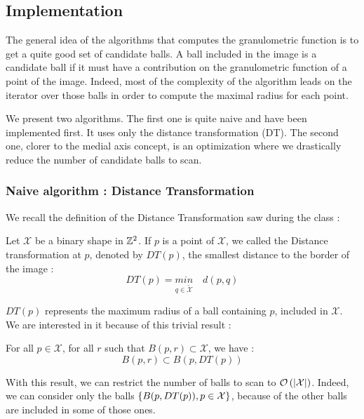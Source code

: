 

\subsection{Implementation}

The general idea of the algorithms that computes the granulometric function is to get a quite good set of candidate balls. A ball included in the image is a candidate ball if it must have a contribution on the granulometric function of a point of the image. Indeed, most of the complexity of the algorithm leads on the iterator over those balls in order to compute the maximal radius for each point. 

We present two algorithms. The first one is quite naive and have been implemented first. It uses only the distance transformation (DT). The second one, clorer to the medial axis concept, is an optimization where we drastically reduce the number of candidate balls to scan.

\subsubsection{Naive algorithm : Distance Transformation}

We recall the definition of the Distance Transformation saw during the class :

\begin{defi}
Let $\mathcal{X}$ be a binary shape in $\mathbb{Z}^{2}$. If $p$ is a point of $\mathcal{X}$, we called the Distance transformation at $p$, denoted by $DT(p)$, the smallest distance to the border of the image :
$$ DT(p) = \underset{q \in \widetilde{\mathcal{X}}}{min} \quad d(p,q) $$
\end{defi}

$DT(p)$ represents the maximum radius of a ball containing $p$, included in $\mathcal{X}$. We are interested in it because of this trivial result :

\begin{theo}[]
	For all $p \in \mathcal{X}$, for all $r$ such that $B(p,r) \subset \mathcal{X}$, we have :
		$$ B(p,r) \subset B(p,DT(p))$$
\end{theo}

With this result, we can restrict the number of balls to scan to $\mathcal O \left( \left| \mathcal{X} \right| \right)$. Indeed, we can consider only the balls $\left\{ B(p,DT(p)), p \in \mathcal{X} \right\}$, because of the other balls are included in some of those ones.

